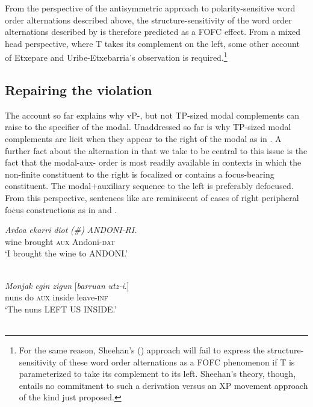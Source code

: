 \documentclass[output=paper]{langscibook}
\begin{document}
From the perspective of the antisymmetric approach to polarity-sensitive word order alternations described above, the structure-sensitivity of the word order alternations described by \cite{etxepare-uribeetxebarria2009} is therefore predicted as a FOFC effect. From a mixed head perspective, where T takes its complement on the left, some other account of Etxepare and Uribe-Etxebarria's observation is required.\footnote{For the same reason, Sheehan's (\citeyear{Sheehan2013fofc,sheehan2013some,sheehan2012fofchff}) approach will fail to express the structure-sensitivity of these word order alternations as a FOFC phenomenon if T is parameterized to take its complement to its left.  Sheehan's theory, though, entails no commitment to such a derivation versus an XP movement approach of the kind just proposed.}


\subsection{Repairing the violation}

The account so far explains why vP-, but not TP-sized modal complements can raise to the specifier of the modal.  Unaddressed so far is why TP-sized modal complements are licit when they appear to the right of the modal as in \protect{}.  A further fact about the alternation in \protect{} that we take to be central to this issue is the fact that the modal-aux- order is most readily available in contexts in which the non-finite constituent to the right is focalized or contains a focus-bearing constituent. The modal+auxiliary sequence to the left is preferably defocused.  From this perspective, sentences like \protect{} are reminiscent of cases of right peripheral focus constructions as in  and .


\ea \label{ex:haddican:41} 
\gll \textit{Ardoa} \textit{ekarri} \textit{diot} \textit{(\#)} \textit{ANDONI-RI.} \\
wine brought \textsc{aux} {} Andoni-\textsc{dat} \\
\glt `I brought the wine to ANDONI.'\\
\citep{elordieta2001} \\
\z

\ea  \label{ex:haddican:42} 
\gll \textit{Monjak} \textit{egin} \textit{zigun} [\textit{barruan} \textit{utz-i}.] \\
nuns do \textsc{aux} inside leave-\textsc{inf} \\
\glt `The nuns LEFT US INSIDE.' \\
\citep{haddican2007} \\
\z
\end{document}
